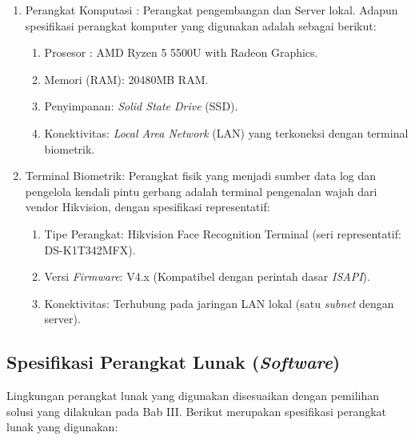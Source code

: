 \begin{enumerate}
    \item Perangkat Komputasi : Perangkat pengembangan dan Server lokal. Adapun spesifikasi perangkat komputer yang digunakan adalah sebagai berikut:
    \begin{enumerate}
        \item Prosesor : AMD Ryzen 5 5500U with Radeon Graphics.
        \item Memori (RAM): 20480MB RAM.
        \item Penyimpanan: \textit{Solid State Drive} (SSD).
        \item Konektivitas: \textit{Local Area Network} (LAN) yang terkoneksi dengan terminal biometrik.
    \end{enumerate}
    \item Terminal Biometrik: Perangkat fisik yang menjadi sumber data log dan pengelola kendali pintu gerbang adalah terminal pengenalan wajah dari vendor Hikvision, dengan spesifikasi representatif:
    \begin{enumerate}
        \item Tipe Perangkat: Hikvision Face Recognition Terminal (seri representatif: DS-K1T342MFX).
        \item Versi \textit{Firmware}: V4.x (Kompatibel dengan perintah dasar \textit{ISAPI}).
        \item Konektivitas: Terhubung pada jaringan LAN lokal (satu \textit{subnet} dengan server).
    \end{enumerate}
\end{enumerate}

\subsection{Spesifikasi Perangkat Lunak (\textit{Software})}
Lingkungan perangkat lunak yang digunakan disesuaikan dengan pemilihan solusi yang dilakukan pada Bab III. Berikut merupakan spesifikasi perangkat lunak yang digunakan:

